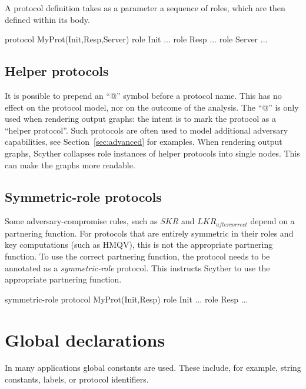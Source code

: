 \documentclass{book}
\begin{document}
A protocol definition takes as a parameter a sequence of roles, which
are then defined within its body.

\begin{spdl}
protocol MyProt(Init,Resp,Server)
{
  role Init {
    ...
  }
  role Resp {
    ...
  }
  role Server {
    ...
  }
}
\end{spdl}

\subsection*{Helper protocols}

It is possible to prepend an ``@'' symbol before a protocol name. This
has no effect on the protocol model, nor on the outcome of the analysis.
The ``@'' is only used when rendering output graphs: the intent is to mark
the protocol as a 
``helper protocol''. Such protocols are often used to model additional adversary
capabilities, see Section~\ref{sec:advanced} for examples.
When rendering output graphs, Scyther collapses role instances of helper
protocols into single nodes. This can make the graphs more readable.

\subsection*{Symmetric-role protocols}

Some adversary-compromise rules, such as $\mathit{SKR}$ and
$\mathit{LKR}_\mathit{aftercorrect}$ depend on a partnering function. For
protocols that are entirely symmetric in their roles and key
computations (such as HMQV), this is not the appropriate partnering
function. To use the correct partnering function, the protocol needs to
be annotated as a \emph{symmetric-role} protocol. This instructs Scyther
to use the appropriate partnering function.

\begin{spdl}
symmetric-role protocol MyProt(Init,Resp)
{
  role Init {
    ...
  }
  role Resp {
    ...
  }
}
\end{spdl}


\section{Global declarations}

In many applications global constants are used. These include, for
example, string constants, labels, or protocol identifiers.
\end{document}
